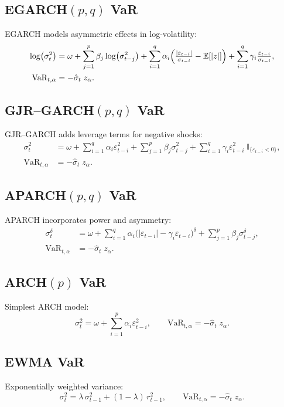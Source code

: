\documentclass[12pt]{article}
\begin{document}
\subsection*{EGARCH$(p,q)$ VaR}
EGARCH models asymmetric effects in log-volatility:
\begin{align*}
  \log\bigl(\sigma_t^2\bigr) &= \omega + \sum_{j=1}^p \beta_j \log\bigl(\sigma_{t-j}^2\bigr)
     + \sum_{i=1}^q \alpha_i \Bigl(\tfrac{|\varepsilon_{t-i}|}{\sigma_{t-i}} - \mathbb{E}[|z|]\Bigr)
     + \sum_{i=1}^q \gamma_i \tfrac{\varepsilon_{t-i}}{\sigma_{t-i}},  \\   
  \text{VaR}_{t,\alpha} &= -\hat{\sigma}_t \; z_\alpha.
\end{align*}

\subsection*{GJR–GARCH$(p,q)$ VaR}
GJR–GARCH adds leverage terms for negative shocks:
\begin{align*}
  \sigma_t^2 &= \omega + \sum_{i=1}^q \alpha_i \varepsilon_{t-i}^2 + \sum_{j=1}^p \beta_j \sigma_{t-j}^2
    + \sum_{i=1}^q \gamma_i \varepsilon_{t-i}^2 \;\mathbb{I}_{\{\varepsilon_{t-i}<0\}},  \\  
  \text{VaR}_{t,\alpha} &= -\hat{\sigma}_t \; z_\alpha.
\end{align*}

\subsection*{APARCH$(p,q)$ VaR}
APARCH incorporates power and asymmetry:
\begin{align*}
  \sigma_t^\delta &= \omega + \sum_{i=1}^q \alpha_i \bigl(|\varepsilon_{t-i}| - \gamma_i \varepsilon_{t-i}\bigr)^\delta
     + \sum_{j=1}^p \beta_j \sigma_{t-j}^\delta,  \\  
  \text{VaR}_{t,\alpha} &= -\hat{\sigma}_t \; z_\alpha.
\end{align*}

\subsection*{ARCH$(p)$ VaR}
Simplest ARCH model:
\[
  \sigma_t^2 = \omega + \sum_{i=1}^p \alpha_i \varepsilon_{t-i}^2,
  \qquad
  \text{VaR}_{t,\alpha} = -\hat{\sigma}_t \; z_\alpha.
\]

\subsection*{EWMA VaR}
Exponentially weighted variance:
\[
  \sigma_t^2 = \lambda\,\sigma_{t-1}^2 + (1-\lambda)\,r_{t-1}^2,
  \qquad
  \text{VaR}_{t,\alpha} = -\hat{\sigma}_t \; z_\alpha.
\]
\end{document}
